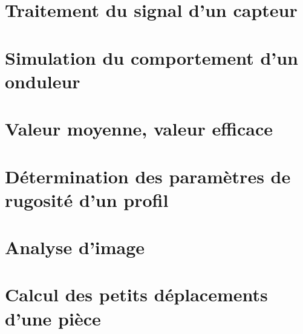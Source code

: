 \documentclass[10pt,fleqn]{article} %
\begin{document}


\def\columnseprulecolor{\color{ocre}}
\setlength{\columnseprule}{0.4pt} 

\begin{multicols}{2}
\section*{Traitement du signal d'un capteur}

\section*{Simulation du comportement d'un onduleur}

\section*{Valeur moyenne, valeur efficace}

\section*{Détermination des paramètres de rugosité d'un profil}

\section*{Analyse d'image}


\section*{Calcul des petits déplacements d'une pièce}

\end{multicols}
\end{document}
